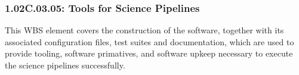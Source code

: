 \subsubsection*{1.02C.03.05: Tools for Science Pipelines}

This WBS element covers the construction of the software, together with its
associated configuration files, test suites and documentation, which are used
to provide tooling, software primatives, and software upkeep necessary to execute
the science pipelines successfully.

